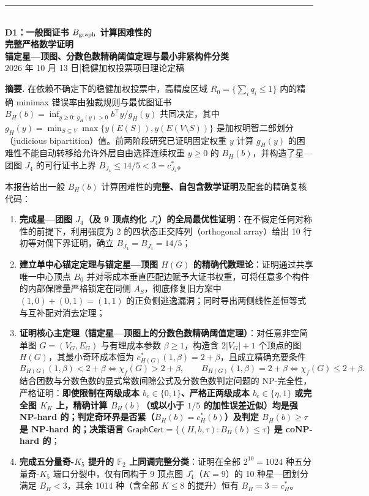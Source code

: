 \documentclass[11pt,a4paper]{ctexart}
\theoremstyle{definition}
\newcommand{\GraphCert}{\mathsf{GraphCert}}
\newcommand{\FF}{\mathbb F}
\newcommand{\1}{\boldsymbol 1}
\newcommand{\0}{\boldsymbol 0}
\newcommand{\chif}{\chi_f}
\begin{document}
\begin{center}
{\color{accent}\rule{\linewidth}{1.4pt}}\\[8mm]
{\Huge\bfseries D1：一般图证书 $B_{\rm graph}$ 计算困难性的\\[3mm]完整严格数学证明}\\[5mm]
{\Large\bfseries 锚定星—顶图、分数色数精确阈值定理与最小非紧构件分类}\\[6mm]
{\large 2026 年 10 月 13 日\quad|\quad 稳健加权投票项目理论定稿}
\end{center}

\vspace{3mm}
\begin{resultbox}
\textbf{摘要.} 在依赖不确定下的稳健加权投票中，高精度区域 $R_0=\{\sum_i q_i\le 1\}$ 内的精确 minimax 错误率由独裁规则与最优图证书 $B_H(b)=\inf_{y\ge 0:\,g_H(y)>0} b^\top y / g_H(y)$ 共同决定，其中 $g_H(y)=\min_{S\subseteq V}\max\{y(E(S)),y(E(V\setminus S))\}$ 是加权明智二部划分（judicious bipartition）值。前两阶段研究已证明固定权重 $y$ 计算 $g_H(y)$ 的困难性不能自动转移给允许外层自由选择连续权重 $y\ge 0$ 的 $B_H(b)$，并构造了星—团图 $J_4$ 的可行证书上界 $B_{J_4}\le 14/5<3=c_{J_4}^*$。

本报告给出一般 $B_H(b)$ 计算困难性的\textbf{完整、自包含数学证明}及配套的精确复核代码：
\begin{enumerate}[label=(\arabic*)]
\item \textbf{完成星—团图 $J_4$（及 9 顶点约化 $J_4^\circ$）的全局最优性证明}：在不假定任何对称性的前提下，利用强度为 $2$ 的四状态正交阵列（orthogonal array）给出 10 行初等对偶下界证明，确立 $\boxed{B_{J_4}=B_{J_4^\circ}=14/5}$；
\item \textbf{建立单中心锚定定理与锚定星—顶图 $H(G)$ 的精确代数理论}：证明通过共享唯一中心顶点 $B_0$ 并对零成本垂直匹配边赋予大证书权重，可将任意多个构件的内部保障量严格锁定在同侧 $A_S$，彻底修复旧方案中 $(1,0)+(0,1)=(1,1)$ 的正负侧逃逸漏洞；同时导出两侧线性差恒等式与互补配对消去定理；
\item \textbf{证明核心主定理（锚定星—顶图上的分数色数精确阈值定理）}：对任意非空简单图 $G=(V_G,E_G)$ 与有理成本参数 $\beta\ge 1$，构造含 $2|V_G|+1$ 个顶点的图 $H(G)$，其最小奇环成本恒为 $c_{H(G)}^*(1,\beta)=2+\beta$，且成立精确充要条件
\[
 \boxed{B_{H(G)}(1,\beta) < 2+\beta \iff \chif(G) > 2+\beta,\qquad B_{H(G)}(1,\beta) = 2+\beta \iff \chif(G) \le 2+\beta.}
\]
结合团数与分数色数的显式常数间隙公式及分数色数判定问题的 NP-完全性，严格证明：\textbf{即使限制在两级成本 $b_e\in\{0,1\}$、严格正两级成本 $b_e\in\{\eta,1\}$ 或完全图 $K_K$ 上，精确计算 $B_H(b)$（或以小于 $1/5$ 的加性误差近似）均是强 NP-hard 的；判定奇环界是否紧（$B_H(b)=c_H^*(b)$）及判定 $B_H(b)\ge\tau$ 是 NP-hard 的；决策语言 $\GraphCert=\{(H,b,\tau):B_H(b)\le\tau\}$ 是 coNP-hard 的}；
\item \textbf{完成五分量奇-$K_5$ 提升的 $\FF_2$ 上同调完整分类}：证明在全部 $2^{10}=1024$ 种五分量奇-$K_5$ 端口分裂中，仅有同构于 9 顶点图 $J_4^\circ$（$K=9$）的 10 种星—团划分满足 $B_H<3$，其余 1014 种（含全部 $K\le 8$ 的提升）恒有 $B_H=3=c_H^*$。
\end{enumerate}
\end{resultbox}
\end{document}
